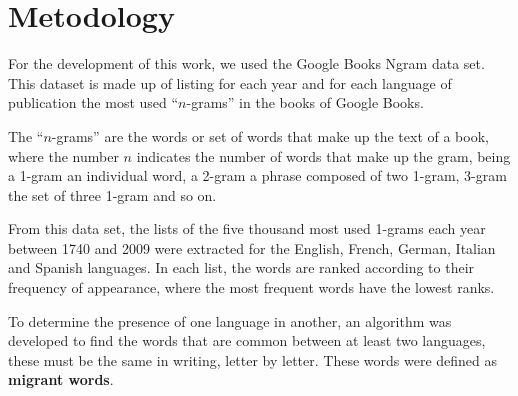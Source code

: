 \documentclass[10pt,letterpaper]{article} %
\begin{document}
	
	\section*{Metodology} %
	
	
	For the development of this work,  we used the Google Books Ngram data set.
	This dataset is made up of listing for each year and for each language of
	publication the most used ``$n$-grams'' in the books of Google Books. 
	
	The ``$n$-grams'' are the words or set of words that make up the text of a
	book, where the number $n$ indicates the number of words that make up the gram,
	being a 1-gram an individual word, a 2-gram a phrase composed of two 1-gram,
	3-gram the set of three 1-gram and so on.
	
	From this data set, the lists of the five thousand most used 1-grams each year
	between 1740 and 2009 were extracted for the English, French, German, Italian
	and Spanish languages. In each list, the words are ranked according to their
	frequency of appearance, where the most frequent words have the lowest ranks.
	
	
	To determine the presence of one language in another, an algorithm was
	developed to find the words that are common between at least two languages,
	these must be the same in writing, letter by letter. These words were defined as \textbf{migrant words}. 
	
\end{document}
